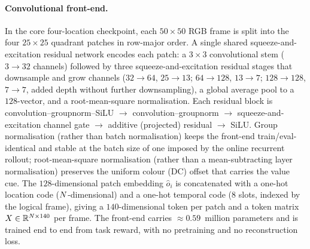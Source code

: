 \paragraph{Convolutional front-end.}
In the core four-location checkpoint, each $50\times50$ RGB frame is split into the four $25\times25$ quadrant
patches in row-major order. A single shared squeeze-and-excitation
residual network encodes each patch: a $3\times3$ convolutional stem
($3 \to 32$ channels) followed by three squeeze-and-excitation residual
stages that downsample and grow channels ($32 \to 64$, $25 \to 13$;
$64 \to 128$, $13 \to 7$; $128 \to 128$, $7 \to 7$, added depth without
further downsampling), a global average pool to a $128$-vector, and a
root-mean-square normalisation. Each residual block is
convolution--groupnorm--SiLU $\to$ convolution--groupnorm $\to$
squeeze-and-excitation channel gate $\to$ additive (projected) residual
$\to$ SiLU. Group normalisation (rather than batch normalisation) keeps
the front-end train/eval-identical and stable at the batch size of one
imposed by the online recurrent rollout; root-mean-square normalisation
(rather than a mean-subtracting layer normalisation) preserves the uniform
colour (DC) offset that carries the value cue. The $128$-dimensional patch
embedding $\hat{o}_i$ is concatenated with a one-hot location code
($N$-dimensional) and a one-hot temporal code ($8$ slots, indexed by
the logical frame), giving a $140$-dimensional token per patch and a token
matrix $X \in \mathbb{R}^{N \times 140}$ per frame. The front-end
carries $\approx 0.59$~million parameters and is trained end to end from
task reward, with no pretraining and no reconstruction loss.

